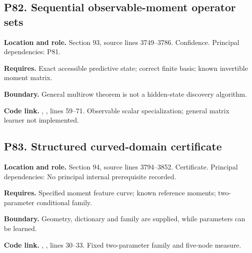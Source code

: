 \documentclass[11pt,oneside,openany]{book}
\numberwithin{equation}{section}
\begin{document}
\par\noindent\begin{minipage}{\textwidth}
\subsection{P82. Sequential observable-moment operator
sets}\label{LSMRegister:p82.-sequential-observable-moment-operator-sets}

\textbf{Location and role.} Section 93, source lines 3749--3786.
Confidence. Principal dependencies: P81.

\textbf{Requires.} Exact accessible predictive state; correct finite
basis; known invertible moment matrix.

\textbf{Boundary.} General multirow theorem is not a hidden-state
discovery algorithm.

\textbf{Code link.} ,
, lines 59--71. Observable scalar
specialization; general matrix learner not implemented.
\end{minipage}\par\medskip

\par\noindent\begin{minipage}{\textwidth}
\subsection{P83. Structured curved-domain
certificate}\label{LSMRegister:p83.-structured-curved-domain-certificate}

\textbf{Location and role.} Section 94, source lines 3794--3852.
Certificate. Principal dependencies: No principal internal prerequisite
recorded.

\textbf{Requires.} Specified moment feature curve; known reference
moments; two-parameter conditional family.

\textbf{Boundary.} Geometry, dictionary and family are supplied, while
parameters can be learned.

\textbf{Code link.} ,
, lines 30--33. Fixed two-parameter family and
five-node measure.
\end{minipage}\par\medskip
\end{document}
